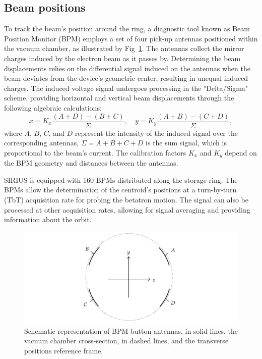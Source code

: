 \subsection{Beam positions}
To track the beam's position around the ring, a diagnostic tool known as Beam Position Monitor (BPM) employs a set of four pick-up antennas positioned within the vacuum chamber, as illustrated by Fig~\ref{fig:bpms_scheme}. The antennas collect the mirror charges induced by the electron beam as it passes by. Determining the beam displacements relies on the differential signal induced on the antennas when the beam deviates from the device's geometric center, resulting in unequal induced charges. The induced voltage signal undergoes processing in the "Delta/Sigma" scheme, providing horizontal and vertical beam displacements through the following algebraic calculations:
\begin{equation}
    x = K_x \frac{(A+D)-(B+C)}{\Sigma}, \quad y = K_y \frac{(A+B)-(C+D)}{\Sigma},
\end{equation}
where $A$, $B$, $C$, and $D$ represent the intensity of the induced signal over the corresponding antennas, $\Sigma = A + B + C + D$ is the sum signal, which is proportional to the beam's current. The calibration factors $K_x$ and $K_y$ depend on the BPM geometry and distances between the antennas.

SIRIUS is equipped with 160 BPMs distributed along the storage ring. The BPMs allow the determination of the centroid's positions at a turn-by-turn (TbT) acquisition rate for probing the betatron motion. The signal can also be processed at other acquisition rates, allowing for signal averaging and providing information about the orbit.
\begin{figure}
    \centering
    \includegraphics[width=\textwidth]{Images/bpm_scheme.pdf}
    \caption[Schematic representation of BPM button antennas, the vacuum chamber cross-section, and the transverse positions reference frame.]{Schematic representation of BPM button antennas, in solid lines, the vacuum chamber cross-section, in dashed lines, and the transverse positions reference frame.}
    \label{fig:bpms_scheme}
\end{figure}
